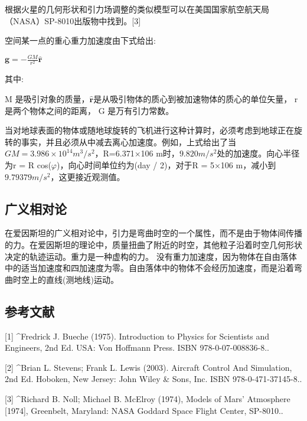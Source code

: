根据火星的几何形状和引力场调整的类似模型可以在美国国家航空航天局（NASA）SP-8010出版物中找到。[3]

空间某一点的重心重力加速度由下式给出:

$\mathbf{g} = -\frac{GM}{r^2} \hat{\mathbf{r}}$

其中:

M 是吸引对象的质量，$\hat{\mathbf{r}}$是从吸引物体的质心到被加速物体的质心的单位矢量， r 是两个物体之间的距离， G 是万有引力常数。

当对地球表面的物体或随地球旋转的飞机进行这种计算时，必须考虑到地球正在旋转的事实，并且必须从中减去离心加速度。例如，上式给出了当$GM = 3.986\times10^{14} m^3/s^2$，R=6.371×106 m时，$9.820 m/s^2$处的加速度。向心半径为r = R cos($\varphi$)，向心时间单位约为(day / 2)，对于R = 5×106 m，减小到$9.79379 m/s^2$，这更接近观测值。

\subsection{广义相对论}

在爱因斯坦的广义相对论中，引力是弯曲时空的一个属性，而不是由于物体间传播的力。在爱因斯坦的理论中，质量扭曲了附近的时空，其他粒子沿着时空几何形状决定的轨迹运动。重力是一种虚构的力。 没有重力加速度，因为物体在自由落体中的适当加速度和四加速度为零。自由落体中的物体不会经历加速度，而是沿着弯曲时空上的直线(测地线)运动。

\subsection{参考文献}

[1]
^Fredrick J. Bueche (1975). Introduction to Physics for Scientists and Engineers, 2nd Ed. USA: Von Hoffmann Press. ISBN 978-0-07-008836-8..

[2]
^Brian L. Stevens; Frank L. Lewis (2003). Aircraft Control And Simulation, 2nd Ed. Hoboken, New Jersey: John Wiley & Sons, Inc. ISBN 978-0-471-37145-8..

[3]
^Richard B. Noll; Michael B. McElroy (1974), Models of Mars' Atmosphere [1974], Greenbelt, Maryland: NASA Goddard Space Flight Center, SP-8010..